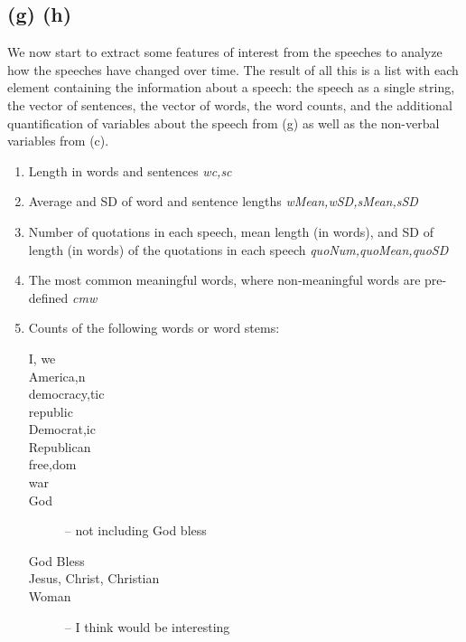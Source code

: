 \documentclass{article}\usepackage{graphicx, color}
\begin{document}
\subsection*{(g) (h)}

We now start to extract some features of interest from the speeches to analyze how the speeches have
changed over time. The result of all this is a list with each element containing the information
about a speech: the speech as a single string, the vector of sentences, the vector of words, the
word counts, and the additional quantification of variables about the speech from (g) as well as
the non-verbal variables from (c).


\begin{enumerate}
\item
Length in words and sentences \textit{wc,sc}
\item
Average and SD of word and sentence lengths \textit{wMean,wSD,sMean,sSD}
\item
Number of quotations in each speech, mean length (in words), and SD of length (in words) of the 
quotations in each speech \textit{quoNum,quoMean,quoSD}
\item
The most common meaningful words, where non-meaningful words are pre-defined \textit{cmw}
\item
Counts of the following words or word stems: 
\begin{description}
\item[I, we]
\item[America{,n}]
\item[democra{cy,tic}]
\item[republic]
\item[Democrat{,ic}]
\item[Republican]
\item[free{,dom}]
\item[war]
\item[God] -- not including God bless
\item[God Bless]
\item[{Jesus, Christ, Christian}]
\item[Woman] -- I think would be interesting
\end{description}
\end{enumerate}
\end{document}
